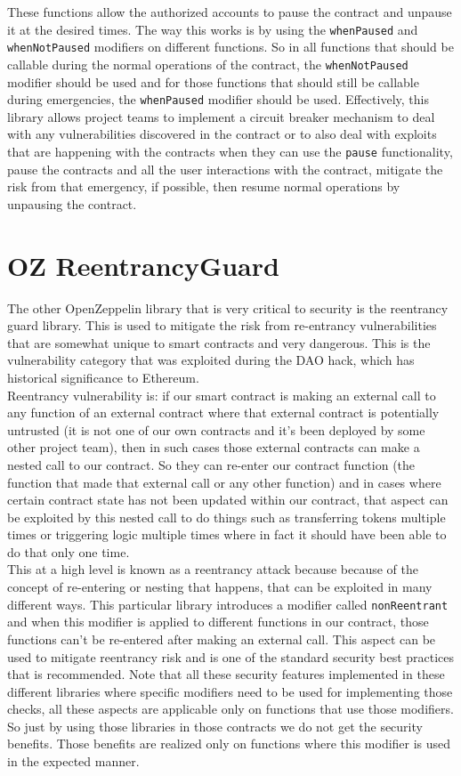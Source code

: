 These functions allow the authorized accounts to pause the contract and unpause it at the desired times. The way this works is by using the \verb|whenPaused| and \verb|whenNotPaused| modifiers on different functions. So in all functions that should be callable during the normal operations of the contract, the \verb|whenNotPaused| modifier should be used and for those functions that should still be callable during emergencies, the \verb|whenPaused| modifier should be used. Effectively, this library allows project teams to implement a circuit breaker mechanism to deal with any vulnerabilities discovered in the contract or to also deal with exploits that are happening with the contracts when they can use the \verb|pause| functionality, pause the contracts and all the user interactions with the contract, mitigate the risk from that emergency, if possible, then resume normal operations by unpausing the contract.

\section{OZ ReentrancyGuard}
The other OpenZeppelin library that is very critical to security is the reentrancy guard library. This is used to mitigate the risk from re-entrancy vulnerabilities that are somewhat unique to smart contracts and very dangerous. This is the vulnerability category that was exploited during the DAO hack, which has historical significance to Ethereum.\\

Reentrancy vulnerability is: if our smart contract is making an external call to any function of an external contract where that external contract is potentially untrusted (it is not one of our own contracts and it's been deployed by some other project team), then in such cases those external contracts can make a nested call to our contract. So they can re-enter our contract function (the function that made that external call or any other function) and in cases where certain contract state has not been updated within our contract, that aspect can be exploited by this nested call to do things such as transferring tokens multiple times or triggering logic multiple times where in fact it should have been able to do that only one time.\\

This at a high level is known as a reentrancy attack because because of the concept of re-entering or nesting that happens, that can be exploited in many different ways. This particular library introduces a modifier called \verb|nonReentrant| and when this modifier is applied to different functions in our contract, those functions can't be re-entered after making an external call. This aspect can be used to mitigate reentrancy risk and is one of the standard security best practices that is recommended. Note that all these security features implemented in these different libraries where specific modifiers need to be used for implementing those checks, all these aspects are applicable only on functions that use those modifiers. So just by using those libraries in those contracts we do not get the security benefits. Those benefits are realized only on functions where this modifier is used in the expected manner.

